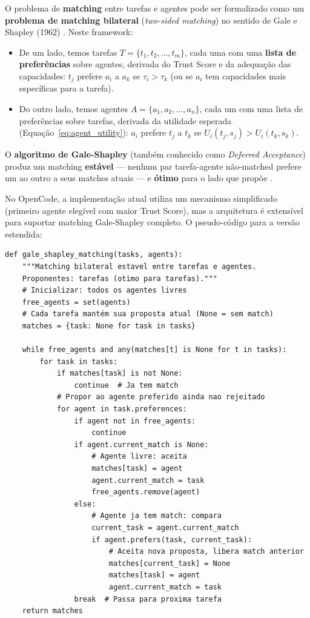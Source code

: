 O problema de \textbf{matching} entre tarefas e agentes pode ser formalizado como um \textbf{problema de matching bilateral} (\textit{two-sided matching}) no sentido de Gale e Shapley (1962) \cite{gale1962college}. Neste framework:

\begin{itemize}
    \item De um lado, temos tarefas $T = \{t_1, t_2, \ldots, t_m\}$, cada uma com uma \textbf{lista de preferências} sobre agentes, derivada do Trust Score e da adequação das capacidades: $t_j$ prefere $a_i$ a $a_k$ se $\tau_i > \tau_k$ (ou se $a_i$ tem capacidades mais específicas para a tarefa).
    
    \item Do outro lado, temos agentes $A = \{a_1, a_2, \ldots, a_n\}$, cada um com uma lista de preferências sobre tarefas, derivada da utilidade esperada (Equação~\eqref{eq:agent_utility}): $a_i$ prefere $t_j$ a $t_k$ se $U_i(t_j, s_j) > U_i(t_k, s_k)$.
\end{itemize}

O \textbf{algoritmo de Gale-Shapley} (também conhecido como \textit{Deferred Acceptance}) produz um matching \textbf{estável} --- nenhum par tarefa-agente não-matched prefere um ao outro a seus matches atuais --- e \textbf{ótimo} para o lado que propõe \cite{gale1962college, roth1984evolution}.

No OpenCode, a implementação atual utiliza um mecanismo simplificado (primeiro agente elegível com maior Trust Score), mas a arquitetura é extensível para suportar matching Gale-Shapley completo. O pseudo-código para a versão estendida:

\begin{verbatim}
def gale_shapley_matching(tasks, agents):
    """Matching bilateral estavel entre tarefas e agentes.
    Proponentes: tarefas (otimo para tarefas)."""
    # Inicializar: todos os agentes livres
    free_agents = set(agents)
    # Cada tarefa mantém sua proposta atual (None = sem match)
    matches = {task: None for task in tasks}

    while free_agents and any(matches[t] is None for t in tasks):
        for task in tasks:
            if matches[task] is not None:
                continue  # Ja tem match
            # Propor ao agente preferido ainda nao rejeitado
            for agent in task.preferences:
                if agent not in free_agents:
                    continue
                if agent.current_match is None:
                    # Agente livre: aceita
                    matches[task] = agent
                    agent.current_match = task
                    free_agents.remove(agent)
                else:
                    # Agente ja tem match: compara
                    current_task = agent.current_match
                    if agent.prefers(task, current_task):
                        # Aceita nova proposta, libera match anterior
                        matches[current_task] = None
                        matches[task] = agent
                        agent.current_match = task
                break  # Passa para proxima tarefa
    return matches
\end{verbatim}

